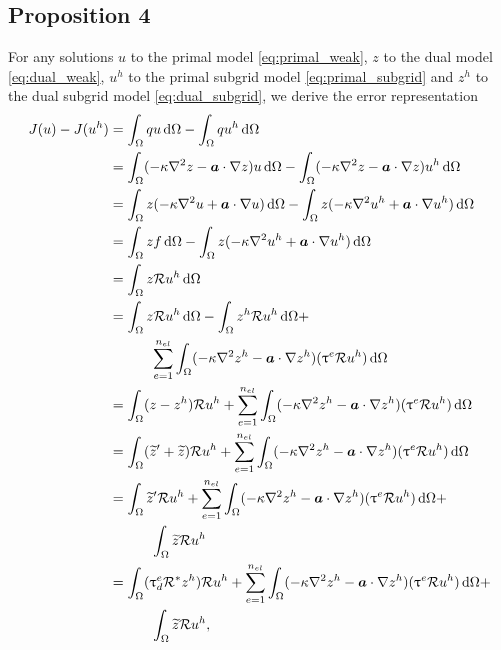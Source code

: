 \subsection{Proposition 4}

For any solutions $u$ to the primal model \eqref{eq:primal_weak},
$z$ to the dual model \eqref{eq:dual_weak}, $u^h$ to the primal
subgrid model \eqref{eq:primal_subgrid} and $z^h$ to the dual
subgrid model \eqref{eq:dual_subgrid}, we derive the error
representation
%
\begin{gather*}
\begin{aligned}
J(u) - J(u^h)
&=
\int_{\Omega} q u \, \text{d} \Omega -
\int_{\Omega} q u^h \, \text{d} \Omega \\
&=
\int_{\Omega} (-\kappa \nabla^2 {z} - \boldsymbol{a} \cdot \nabla {z}) u \, \text{d} \Omega -
\int_{\Omega} (-\kappa \nabla^2 {z} - \boldsymbol{a} \cdot \nabla {z}) u^h \, \text{d} \Omega \\
& =
\int_{\Omega} z (-\kappa \nabla^2 {u} + \boldsymbol{a} \cdot \nabla {u}) \, \text{d} \Omega -
\int_{\Omega} z (-\kappa \nabla^2 {u^h} + \boldsymbol{a} \cdot \nabla {u^h}) \, \text{d} \Omega \\
&=
\int_{\Omega} z f \, \text{d} \Omega -
\int_{\Omega} z (-\kappa \nabla^2 {u^h} + \boldsymbol{a} \cdot \nabla {u^h}) \, \text{d} \Omega \\
&=
\int_{\Omega} z \mathcal{R} u^h \, \text{d} \Omega \\
&=
\int_{\Omega} z \mathcal{R} u^h \, \text{d} \Omega -
\int_{\Omega} z^h \mathcal{R} u^h \, \text{d} \Omega + \\
& \quad \quad \quad \sum_{e=1}^{n_{el}} \int_{\Omega} (-\kappa \nabla^2 {z^h} - \boldsymbol{a} \cdot \nabla {z^h})(\uptau^e \mathcal{R} u^h)
\, \text{d} \Omega \\
&=
\int_{\Omega} (z - z^h) \mathcal{R} u^h +
\sum_{e=1}^{n_{el}} \int_{\Omega} (-\kappa \nabla^2 {z^h} - \boldsymbol{a} \cdot \nabla {z^h})(\uptau^e \mathcal{R} u^h)
\, \text{d} \Omega \\
&=
\int_{\Omega} (\widetilde{z}' + \widetilde{z}) \mathcal{R} u^h +
\sum_{e=1}^{n_{el}} \int_{\Omega} (-\kappa \nabla^2 {z^h} - \boldsymbol{a} \cdot \nabla {z^h})(\uptau^e \mathcal{R} u^h)
\, \text{d} \Omega \\
&=
\int_{\Omega} \widetilde{z}' \mathcal{R} u^h +
\sum_{e=1}^{n_{el}} \int_{\Omega} (-\kappa \nabla^2 {z^h} - \boldsymbol{a} \cdot \nabla {z^h})(\uptau^e \mathcal{R} u^h)
\, \text{d} \Omega + \\
& \quad \quad \quad \int_{\Omega} \widetilde{z} \mathcal{R} u^h \\
&=
\int_{\Omega} (\uptau^e_d \mathcal{R}^* z^h) \mathcal{R} u^h +
\sum_{e=1}^{n_{el}} \int_{\Omega} (-\kappa \nabla^2 {z^h} - \boldsymbol{a} \cdot \nabla {z^h})(\uptau^e \mathcal{R} u^h)
\, \text{d} \Omega + \\
& \quad \quad \quad \int_{\Omega} \widetilde{z} \mathcal{R} u^h,
\end{aligned}
\end{gather*}

